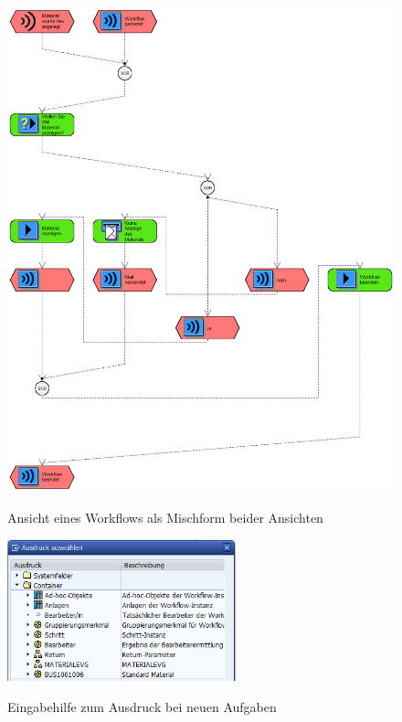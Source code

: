 \begin{figure}[H]
	\begin{center}
	\includegraphics[height=0.9\textheight]{grafiken/wf-builder_view-epc.png}
	\caption{Ansicht eines Workflows als Mischform beider Ansichten}
	\vspace{-10pt}
	\label{abb:workflow-view-epc}
	\end{center}
\end{figure}

\begin{figure}[h]
	\begin{center}
	\includegraphics[width=250px]{grafiken/wf-builder_bsp1_formular-aufgabe_eingabehilfe-ausdruck.png}
	\caption{Eingabehilfe zum Ausdruck bei neuen Aufgaben}
	\vspace{-10pt}
	\label{abb:workflow-bsp1-aufgaben_form-inputhelp}
	\end{center}
\end{figure}

